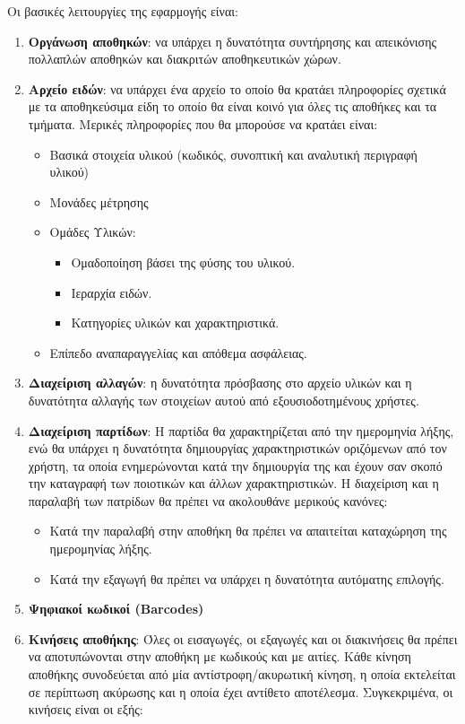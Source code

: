 Οι βασικές λειτουργίες της εφαρμογής είναι:

\begin{enumerate}
  \item \textbf{Οργάνωση αποθηκών}: να υπάρχει η δυνατότητα συντήρησης και απεικόνισης πολλαπλών αποθηκών και διακριτών αποθηκευτικών χώρων.
  \item \textbf{Αρχείο ειδών}: να υπάρχει ένα αρχείο το οποίο θα κρατάει πληροφορίες σχετικά με τα αποθηκεύσιμα είδη το οποίο θα είναι κοινό για όλες τις αποθήκες και τα τμήματα. Μερικές πληροφορίες που θα μπορούσε να κρατάει είναι:
    \begin{itemize}
      \item Βασικά στοιχεία υλικού (κωδικός, συνοπτική και αναλυτική περιγραφή υλικού)
      \item Μονάδες μέτρησης
      \item Ομάδες Υλικών:
        \begin{itemize}
          \item Ομαδοποίηση βάσει της φύσης του υλικού.
          \item Ιεραρχία ειδών.
          \item Κατηγορίες υλικών και χαρακτηριστικά.
        \end{itemize}
      \item Επίπεδο αναπαραγγελίας και απόθεμα ασφάλειας.
    \end{itemize}
  \item \textbf{Διαχείριση αλλαγών}: η δυνατότητα πρόσβασης στο αρχείο υλικών και η δυνατότητα αλλαγής των στοιχείων αυτού από εξουσιοδοτημένους χρήστες.
  \item \textbf{Διαχείριση παρτίδων}: Η παρτίδα θα χαρακτηρίζεται από την ημερομηνία λήξης, ενώ θα υπάρχει η δυνατότητα δημιουργίας χαρακτηριστικών οριζόμενων από τον χρήστη, τα οποία ενημερώνονται κατά την δημιουργία της και έχουν σαν σκοπό την καταγραφή των ποιοτικών και άλλων χαρακτηριστικών. Η διαχείριση και η παραλαβή των πατρίδων θα πρέπει να ακολουθάνε μερικούς κανόνες:
    \begin{itemize}
      \item Κατά την παραλαβή στην αποθήκη θα πρέπει να απαιτείται καταχώρηση της ημερομηνίας λήξης.
      \item Κατά την εξαγωγή θα πρέπει να υπάρχει η δυνατότητα αυτόματης επιλογής.
    \end{itemize}
  \item \textbf{Ψηφιακοί κωδικοί (Barcodes)}
  \item \textbf{Κινήσεις αποθήκης}: Όλες οι εισαγωγές, οι εξαγωγές και οι διακινήσεις θα πρέπει να αποτυπώνονται στην αποθήκη με κωδικούς και με αιτίες. Κάθε κίνηση αποθήκης συνοδεύεται από μία αντίστροφη/ακυρωτική κίνηση, η οποία εκτελείται σε περίπτωση ακύρωσης και η οποία έχει αντίθετο αποτέλεσμα. Συγκεκριμένα, οι κινήσεις είναι οι εξής:

\end{enumerate}
